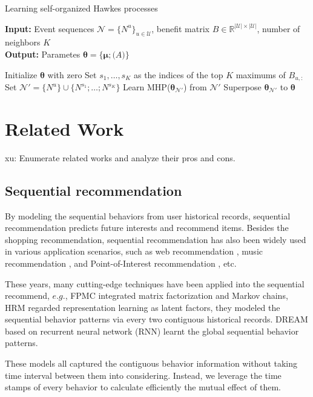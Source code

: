 \documentclass[runningheads]{llncs}
\newcommand{\xu}[1]{{\color{red} xu: #1}}
\begin{document}
\begin{algorithm}[t]
\caption{Learning self-organized Hawkes processes} 
\hspace*{0.02in} {\bf Input:}
Event sequences $\mathcal{N}=\{N^u\}_{u \in \mathcal{U}}$, benefit matrix $B \in \mathbb{R}^{|\mathcal{U}| \times |\mathcal{U}|}$, number of neighbors $K$ \\
\hspace*{0.02in} {\bf Output:} 
Parametes $\bm{\theta} = \{\bm{\mu};\bm(A)\}$
\begin{algorithmic}[1]
\State Initialize $\bm{\theta}$ with zero
    \State Set $s_1, \ldots, s_K$ as the indices of the top $K$ maximums of $B_{u,:}$
    \State Set $\mathcal{N}' = \{N^u\} \cup \{N^{s_1};\ldots;N^{s_K}\}$
    \State Learn MHP($\bm{\theta}_{ \mathcal{N}' }$) from $ \mathcal{N}' $
    \State Superpose $\bm{\theta}_{ \mathcal{N}' }$ to $\bm{\theta}$ 
\EndFor
\end{algorithmic}
\end{algorithm}


\section{Related Work}
\xu{Enumerate related works and analyze their pros and cons.}
\subsection{Sequential recommendation}

By modeling the sequential behaviors from user historical records, sequential recommendation predicts future interests and recommend items. Besides the shopping recommendation, sequential recommendation has also been widely used in various application scenarios, such as web recommendation \cite{zhang2015task},  music recommendation \cite{chen2012playlist}, and Point-of-Interest recommendation \cite{cheng2013you}\cite{feng2015personalized}, etc.

These years, many cutting-edge techniques have been applied into the sequential recommend, $e.g.$, FPMC\cite{rendle2010factorizing} integrated matrix factorization and Markov chains, HRM\cite{wang2015learning} regarded representation learning as latent factors, they modeled the sequential behavior patterns via every two contiguous historical records. DREAM\cite{yu2016dynamic} based on recurrent neural network (RNN) learnt the global sequential behavior patterns.

These models all captured the contiguous behavior information without taking time interval between them into considering. Instead, we leverage the time stamps of every behavior to calculate efficiently the mutual effect of them.
\end{document}
